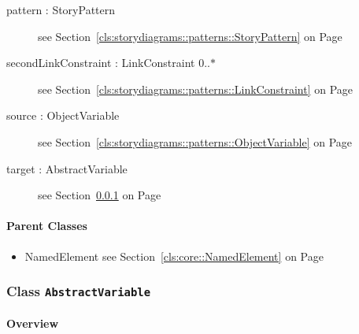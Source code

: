 \begin{description}
\begin{description}
\item[pattern : StoryPattern 	]
see Section~\ref{cls:storydiagrams::patterns::StoryPattern} on Page~\pageref{cls:storydiagrams::patterns::StoryPattern}
\hspace{\fill}
\nopagebreak


	
\item[secondLinkConstraint : LinkConstraint 			0..$*$]
see Section~\ref{cls:storydiagrams::patterns::LinkConstraint} on Page~\pageref{cls:storydiagrams::patterns::LinkConstraint}
\hspace{\fill}
\nopagebreak


	
\item[source : ObjectVariable 	]
see Section~\ref{cls:storydiagrams::patterns::ObjectVariable} on Page~\pageref{cls:storydiagrams::patterns::ObjectVariable}
\hspace{\fill}
\nopagebreak


	
\item[target : AbstractVariable 	]
see Section~\ref{cls:storydiagrams::patterns::AbstractVariable} on Page~\pageref{cls:storydiagrams::patterns::AbstractVariable}
\hspace{\fill}
\nopagebreak


	
	\end{description}
	

\end{description}

\paragraph{Parent Classes}
\begin{itemize}
\item NamedElement see Section~\ref{cls:core::NamedElement} on Page~\pageref{cls:core::NamedElement}\end{itemize}
\subsubsection{\Large{Class \bfseries \texttt{AbstractVariable}\normalfont}}
\label{cls:storydiagrams::patterns::AbstractVariable} 
\paragraph{Overview}

